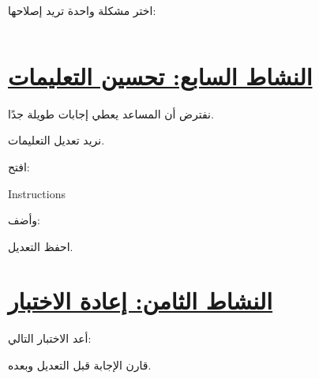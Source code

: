 \documentclass[a4paper]{article}
\begin{document}
اختر مشكلة واحدة تريد إصلاحها:

\[
\boxed{\hspace{15cm}}
\]



\section*{\khatt\underline{النشاط السابع: تحسين التعليمات}}

نفترض أن المساعد يعطي إجابات طويلة جدًا.

نريد تعديل التعليمات.

افتح:

\begin{center}

\textenglish{Instructions}

\end{center}

وأضف:

\begin{center}


\end{center}

احفظ التعديل.



\section*{\khatt\underline{النشاط الثامن: إعادة الاختبار}}

أعد الاختبار التالي:

\begin{center}


\end{center}

قارن الإجابة قبل التعديل وبعده.
\end{document}
